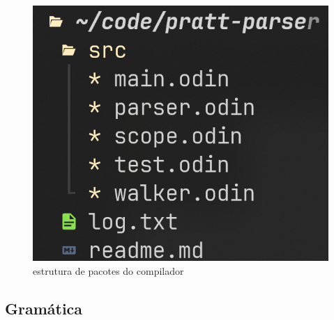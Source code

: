 \documentclass[english, 
               brazil, 
               bsc] %
               {dcomp-abntex2}
\begin{document}
\begin{figure}[H]
	\caption{\label{folder} \small estrutura de pacotes do compilador}
	\begin{center}
	    \includegraphics[scale=0.5]{./Imagens/folder_structuer_odin_parser_lexer.png}
	\end{center}
\end{figure}

\subsection{Gramática}
\end{document}
